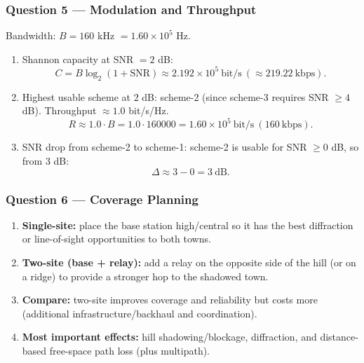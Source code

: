 \documentclass[11pt,a4paper]{article}
\begin{document}
\subsubsection*{Question 5 --- Modulation and Throughput}
Bandwidth: $B=160$ kHz $=1.60\times 10^5$ Hz.

\begin{enumerate}[label=\alph*.]
    \item Shannon capacity at SNR $=2$ dB:
    \[
    C=B\log_2(1+\mathrm{SNR})\approx 2.192\times 10^5\ \text{bit/s}\ (\approx 219.22\ \text{kbps}).
    \]
    \item Highest usable scheme at $2$ dB: scheme-2 (since scheme-3 requires SNR $\ge 4$ dB). Throughput $\approx 1.0$ bit/s/Hz.
    \[
    R\approx 1.0\cdot B=1.0\cdot 160000=1.60\times 10^5\ \text{bit/s}\ (160\ \text{kbps}).
    \]
    \item SNR drop from scheme-2 to scheme-1:
    scheme-2 is usable for SNR $\ge 0$ dB, so from $3$ dB:
    \[
    \Delta \approx 3-0=3\ \text{dB}.
    \]
\end{enumerate}

\subsubsection*{Question 6 --- Coverage Planning}
\begin{enumerate}[label=\alph*.]
    \item \textbf{Single-site:} place the base station high/central so it has the best diffraction or line-of-sight opportunities to both towns.
    \item \textbf{Two-site (base + relay):} add a relay on the opposite side of the hill (or on a ridge) to provide a stronger hop to the shadowed town.
    \item \textbf{Compare:} two-site improves coverage and reliability but costs more (additional infrastructure/backhaul and coordination).
    \item \textbf{Most important effects:} hill shadowing/blockage, diffraction, and distance-based free-space path loss (plus multipath).
    
\end{enumerate}
\end{document}
